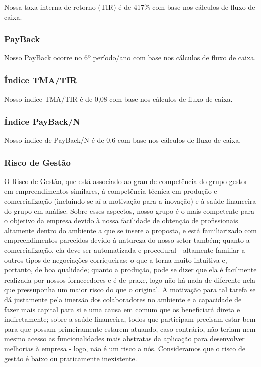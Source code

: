 \documentclass[onecolumn,12pt]{asme2ej}
\begin{document}
Nossa taxa interna de retorno (TIR) é de 417\% com base nos cálculos de fluxo de caixa.

\subsubsection{PayBack}

Nosso PayBack ocorre no 6º período/ano com base nos cálculos de fluxo de caixa. 

\subsubsection{Índice TMA/TIR}

Nosso índice TMA/TIR é de 0,08 com base nos cálculos de fluxo de caixa.

\subsubsection{Índice PayBack/N}

Nosso índice de PayBack/N é de 0,6 com base nos cálculos de fluxo de caixa.

\subsubsection{Risco de Gestão}

O Risco de Gestão, que está associado ao grau de competência do grupo gestor em empreendimentos similares, à competência técnica em produção e comercialização (incluindo-se aí a motivação para a inovação) e à saúde financeira do grupo em análise. Sobre esses aspectos, nosso grupo é o mais competente para o objetivo da empresa devido à nossa facilidade de obtenção de profissionais altamente dentro do ambiente a que se insere a proposta, e está familiarizado com empreendimentos parecidos devido à natureza do nosso setor também; quanto a comercialização, ela deve ser automatizada e procedural - altamente familiar a outros tipos de negociações corriqueiras: o que a torna muito intuitiva e, portanto, de boa qualidade; quanto a produção, pode se dizer que ela é facilmente realizada por nossos fornecedores e é de praxe, logo não há nada de diferente nela que pressuponha um maior risco do que o original. A motivação para tal tarefa se dá justamente pela imersão dos colaboradores no ambiente e a capacidade de fazer mais capital para si e uma causa em comum que os beneficiará direta e indiretamente; sobre a saúde financeira, todos que participam precisam estar bem para que possam primeiramente estarem atuando, caso contrário, não teriam nem mesmo acesso as funcionalidades mais abstratas da aplicação para desenvolver melhorias à empresa - logo, não é um risco a nós. Consideramos que o risco de gestão é baixo ou praticamente inexistente.
\end{document}
